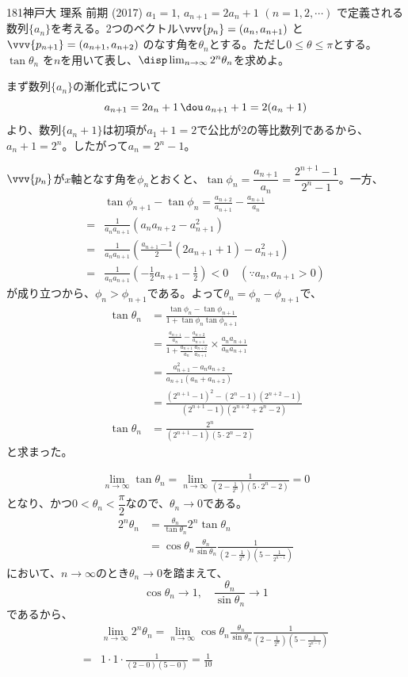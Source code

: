 \begin{prob}{181}{}{神戸大 理系 前期 (2017)}
 $a_1=1$, $a_{n+1}=2a_n+1$ $(n=1, 2, \cdots)$ で定義される数列$\{a_n\}$を考える。2つのベクトル$\vvv{p_n}=(a_n, a_{n+1})$ と$\vvv{p_{n+1}}=(a_{n+1},a_{n+2})$ のなす角を$\theta_n$とする。ただし$0\le\theta\le\pi$とする。$\tan\theta_n$ を$n$を用いて表し、$\disp \lim_{n\to\infty}2^n\theta_n$を求めよ。
\end{prob}

まず数列$\{a_n\}$の漸化式について
\[ a_{n+1}=2a_n+1 \,\dou\, a_{n+1}+1=2(a_n+1) \]
より、数列$\{a_n+1\}$は初項が$a_1+1=2$で公比が2の等比数列であるから、$a_n+1=2^n$。したがって$a_n=2^n-1$。

$\vvv{p_n}$が$x$軸となす角を$\phi_n$とおくと、$\tan\phi_n=\dfrac{a_{n+1}}{a_n}=\dfrac{2^{n+1}-1}{2^n-1}$。一方、
\begin{align*}
 &\tan\phi_{n+1}-\tan\phi_n=\frac{a_{n+2}}{a_{n+1}}-\frac{a_{n+1}}{a_n} \\
 =&\frac{1}{a_na_{n+1}}(a_na_{n+2}-a_{n+1}^2) \\
 =&\frac{1}{a_na_{n+1}}\left(\frac{a_{n+1}-1}{2}(2a_{n+1}+1)-a_{n+1}^2\right) \\
 =&\frac{1}{a_na_{n+1}}\left(-\frac{1}{2}a_{n+1}-\frac{1}{2}\right) < 0 \quad (\because a_n, a_{n+1}>0)
\end{align*}
が成り立つから、$\phi_n>\phi_{n+1}$である。よって$\theta_n=\phi_n-\phi_{n+1}$で、
\begin{align*}
 \tan\theta_n&=\frac{\tan\phi_n-\tan\phi_{n+1}}{1+\tan\phi_n\tan\phi_{n+1}} \\
 &=\frac{\frac{a_{n+1}}{a_n}-\frac{a_{n+2}}{a_{n+1}}}{1+\frac{a_{n+1}}{a_n}\frac{a_{n+2}}{a_{n+1}}}\times\frac{a_na_{n+1}}{a_na_{n+1}} \\
 &=\frac{a_{n+1}^2-a_na_{n+2}}{a_{n+1}(a_n+a_{n+2})} \\
 &=\frac{(2^{n+1}-1)^2-(2^n-1)(2^{n+2}-1)}{(2^{n+1}-1)(2^{n+2}+2^n-2)} \\
 \tan\theta_n&=\frac{2^n}{(2^{n+1}-1)(5\cdot 2^n-2)}
\end{align*}
と求まった。

\begin{align*}
 \lim_{n\to\infty} \tan\theta_n=\lim_{n\to\infty} \frac{1}{\left(2-\frac{1}{2^n}\right)(5\cdot2^n-2)}=0
\end{align*}
となり、かつ$0<\theta_n<\dfrac{\pi}{2}$なので、$\theta_n\to 0$である。
\begin{align*}
 2^n\theta_n&=\frac{\theta_n}{\tan\theta_n}2^n\tan\theta_n \\
 &=\cos\theta_n\frac{\theta_n}{\sin\theta_n}\frac{1}{\left(2-\frac{1}{2^n}\right)\left(5-\frac{1}{2^{n-1}}\right)}
\end{align*}
において、$n\to\infty$のとき$\theta_n\to 0$を踏まえて、
\[ \cos\theta_n\to 1,\quad \frac{\theta_n}{\sin\theta_n}\to 1 \]
であるから、
\begin{align*}
 &\lim_{n\to\infty} 2^n\theta_n = \lim_{n\to\infty} \cos\theta_n\frac{\theta_n}{\sin\theta_n}\frac{1}{\left(2-\frac{1}{2^n}\right)\left(5-\frac{1}{2^{n-1}}\right)} \\
 =& 1\cdot 1\cdot \frac{1}{(2-0) (5-0)}=\frac{1}{10}
\end{align*}
